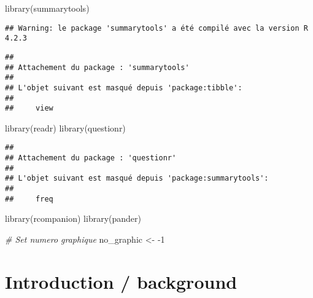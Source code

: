 \documentclass[
]{article}
\newenvironment{Shaded}{\begin{snugshade}}{\end{snugshade}}
\newcommand{\CommentTok}[1]{\textcolor[rgb]{0.56,0.35,0.01}{\textit{#1}}}
\newcommand{\DecValTok}[1]{\textcolor[rgb]{0.00,0.00,0.81}{#1}}
\newcommand{\FunctionTok}[1]{\textcolor[rgb]{0.00,0.00,0.00}{#1}}
\newcommand{\NormalTok}[1]{#1}
\newcommand{\OtherTok}[1]{\textcolor[rgb]{0.56,0.35,0.01}{#1}}
\newcommand{\SpecialCharTok}[1]{\textcolor[rgb]{0.00,0.00,0.00}{#1}}
\begin{document}
\begin{Shaded}
\begin{Highlighting}[]
\FunctionTok{library}\NormalTok{(summarytools)}
\end{Highlighting}
\end{Shaded}

\begin{verbatim}
## Warning: le package 'summarytools' a été compilé avec la version R 4.2.3
\end{verbatim}

\begin{verbatim}
## 
## Attachement du package : 'summarytools'
## 
## L'objet suivant est masqué depuis 'package:tibble':
## 
##     view
\end{verbatim}

\begin{Shaded}
\begin{Highlighting}[]
\FunctionTok{library}\NormalTok{(readr)}
\FunctionTok{library}\NormalTok{(questionr)}
\end{Highlighting}
\end{Shaded}

\begin{verbatim}
## 
## Attachement du package : 'questionr'
## 
## L'objet suivant est masqué depuis 'package:summarytools':
## 
##     freq
\end{verbatim}

\begin{Shaded}
\begin{Highlighting}[]
\FunctionTok{library}\NormalTok{(rcompanion)}
\FunctionTok{library}\NormalTok{(pander)}
\end{Highlighting}
\end{Shaded}

\begin{Shaded}
\begin{Highlighting}[]
\CommentTok{\# Set numero graphique}
\NormalTok{no\_graphic }\OtherTok{\textless{}{-}} \SpecialCharTok{{-}}\DecValTok{1}
\end{Highlighting}
\end{Shaded}

\hypertarget{introduction-background}{%
\section{Introduction / background}\label{introduction-background}}
\end{document}
